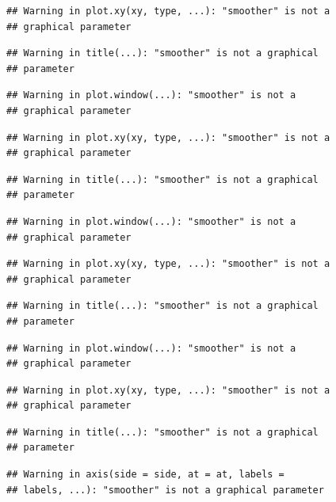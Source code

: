 \documentclass[12pt,]{krantz}
\begin{document}
\begin{verbatim}
## Warning in plot.xy(xy, type, ...): "smoother" is not a
## graphical parameter
\end{verbatim}

\begin{verbatim}
## Warning in title(...): "smoother" is not a graphical
## parameter
\end{verbatim}

\begin{verbatim}
## Warning in plot.window(...): "smoother" is not a
## graphical parameter
\end{verbatim}

\begin{verbatim}
## Warning in plot.xy(xy, type, ...): "smoother" is not a
## graphical parameter
\end{verbatim}

\begin{verbatim}
## Warning in title(...): "smoother" is not a graphical
## parameter
\end{verbatim}

\begin{verbatim}
## Warning in plot.window(...): "smoother" is not a
## graphical parameter
\end{verbatim}

\begin{verbatim}
## Warning in plot.xy(xy, type, ...): "smoother" is not a
## graphical parameter
\end{verbatim}

\begin{verbatim}
## Warning in title(...): "smoother" is not a graphical
## parameter
\end{verbatim}

\begin{verbatim}
## Warning in plot.window(...): "smoother" is not a
## graphical parameter
\end{verbatim}

\begin{verbatim}
## Warning in plot.xy(xy, type, ...): "smoother" is not a
## graphical parameter
\end{verbatim}

\begin{verbatim}
## Warning in title(...): "smoother" is not a graphical
## parameter
\end{verbatim}

\begin{verbatim}
## Warning in axis(side = side, at = at, labels =
## labels, ...): "smoother" is not a graphical parameter
\end{verbatim}
\end{document}
